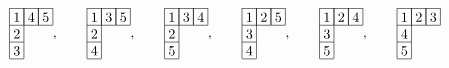 \[
 \begin{array}[c]{*{3}c}\cline{1-3}
 \lr{1}&\lr{4}&\lr{5}\\\cline{1-3}
 \lr{2}\\\cline{1-1}
 \lr{3}\\\cline{1-1}
 \end{array},\hspace{20pt}
 \begin{array}[c]{*{3}c}\cline{1-3}
 \lr{1}&\lr{3}&\lr{5}\\\cline{1-3}
 \lr{2}\\\cline{1-1}
 \lr{4}\\\cline{1-1}
 \end{array},\hspace{20pt}
 \begin{array}[c]{*{3}c}\cline{1-3}
 \lr{1}&\lr{3}&\lr{4}\\\cline{1-3}
 \lr{2}\\\cline{1-1}
 \lr{5}\\\cline{1-1}
 \end{array},\hspace{20pt}
 \begin{array}[c]{*{3}c}\cline{1-3}
 \lr{1}&\lr{2}&\lr{5}\\\cline{1-3}
 \lr{3}\\\cline{1-1}
 \lr{4}\\\cline{1-1}
 \end{array},\hspace{20pt}
 \begin{array}[c]{*{3}c}\cline{1-3}
 \lr{1}&\lr{2}&\lr{4}\\\cline{1-3}
 \lr{3}\\\cline{1-1}
 \lr{5}\\\cline{1-1}
 \end{array},\hspace{20pt}
 \begin{array}[c]{*{3}c}\cline{1-3}
 \lr{1}&\lr{2}&\lr{3}\\\cline{1-3}
 \lr{4}\\\cline{1-1}
 \lr{5}\\\cline{1-1}
 \end{array}
 \]

